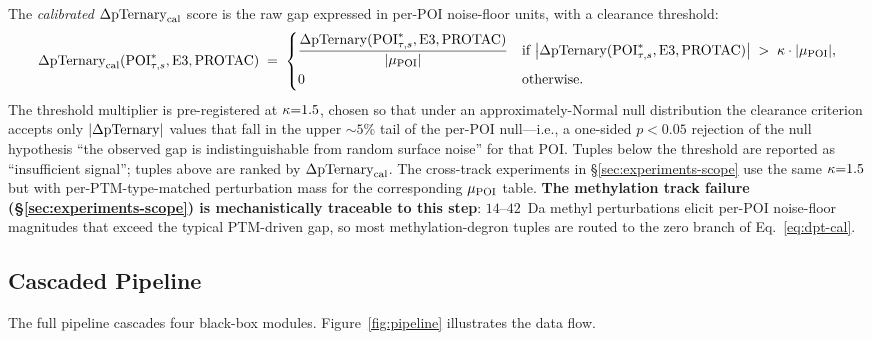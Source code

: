 The \emph{calibrated} $\Delta\mathrm{pTernary}_{\mathrm{cal}}$ score is the raw gap expressed in per-POI noise-floor units, with a clearance threshold:
\begin{equation}
\label{eq:dpt-cal}
\Delta\mathrm{pTernary}_{\mathrm{cal}}(\mathrm{POI}^{*}_{\tau,s},\mathrm{E3},\mathrm{PROTAC}) \;=\;
\begin{cases}
\dfrac{\Delta\mathrm{pTernary}(\mathrm{POI}^{*}_{\tau,s},\mathrm{E3},\mathrm{PROTAC})}{|\mu_{\mathrm{POI}}|} & \text{if } \big|\Delta\mathrm{pTernary}(\mathrm{POI}^{*}_{\tau,s},\mathrm{E3},\mathrm{PROTAC})\big| \;>\; \kappa \cdot |\mu_{\mathrm{POI}}|, \\[1.5ex]
0 & \text{otherwise.}
\end{cases}
\end{equation}
The threshold multiplier is pre-registered at $\kappa {=} 1.5$, chosen so that under an approximately-Normal null distribution the clearance criterion accepts only $|\Delta\mathrm{pTernary}|$ values that fall in the upper $\sim 5\%$ tail of the per-POI null---i.e., a one-sided $p < 0.05$ rejection of the null hypothesis ``the observed gap is indistinguishable from random surface noise'' for that POI. Tuples below the threshold are reported as ``insufficient signal''; tuples above are ranked by $\Delta\mathrm{pTernary}_{\mathrm{cal}}$. The cross-track experiments in \S\ref{sec:experiments-scope} use the same $\kappa {=} 1.5$ but with per-PTM-type-matched perturbation mass for the corresponding $\mu_{\mathrm{POI}}$ table. \textbf{The methylation track failure (\S\ref{sec:experiments-scope}) is mechanistically traceable to this step}: $14$--$42$~Da methyl perturbations elicit per-POI noise-floor magnitudes that exceed the typical PTM-driven gap, so most methylation-degron tuples are routed to the zero branch of Eq.~\ref{eq:dpt-cal}.

\subsection{Cascaded Pipeline}
\label{sec:method-pipeline}

The full pipeline cascades four black-box modules. Figure~\ref{fig:pipeline} illustrates the data flow.

